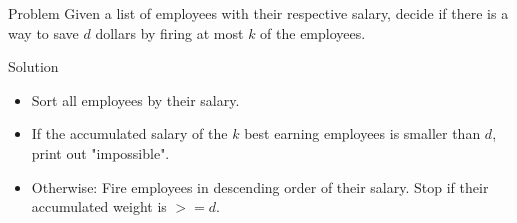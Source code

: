 \begin{slide}
    \begin{block}{Problem}
        Given a list of employees with their respective salary, decide if there is a way to save $d$ dollars by firing at most $k$ of the employees.
    \end{block}
    \begin{block}{Solution}
        \begin{itemize}
        	\item Sort all employees by their salary.
        	\item If the accumulated salary of the $k$ best earning employees is smaller than $d$, print out "impossible".
        	\item Otherwise: Fire employees in descending order of their salary. Stop if their accumulated weight is $>= d$.
        \end{itemize}
    \end{block}
\end{slide}
